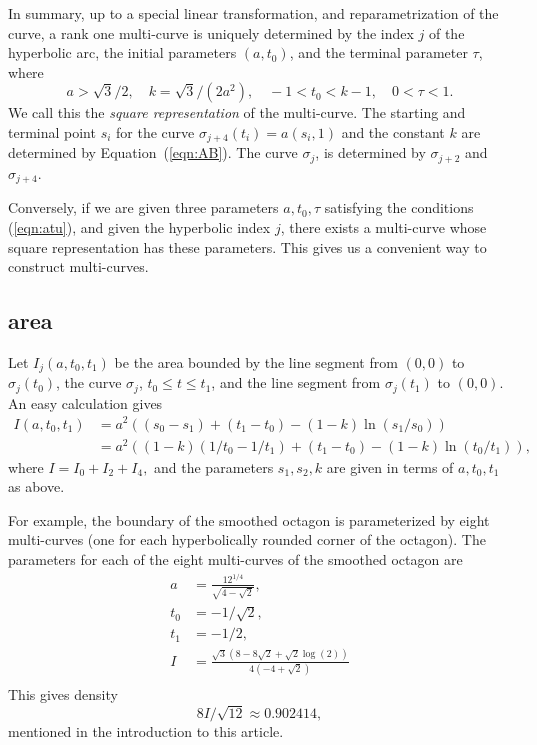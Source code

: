\documentclass[11pt]{amsart}
\def\ta{{\tau}}
\begin{document}
In summary, up to a special linear transformation, and reparametrization of the curve, a rank one multi-curve is uniquely determined by the index $j$ of the hyperbolic arc,
the initial parameters $(a,t_0)$, and the terminal parameter $\ta$, where
  \begin{equation}\label{eqn:atu}
  a > \sqrt{3}/2,\quad  k = \sqrt{3}/(2a^2),\quad -1 < t_0 < k - 1,
  \quad 0 < \ta < 1.
  \end{equation}
We call this the {\it square representation} of the multi-curve.
The starting and terminal point $s_i$ for the curve $\sigma_{j+4}(t_i) = a(s_i,1)$ and the constant $k$ are determined by Equation~(\ref{eqn:AB}).  The curve $\sigma_{j}$, is determined by $\sigma_{j+2}$ and $\sigma_{j+4}$. 

Conversely, if we are given three parameters $a,t_0,\ta$ satisfying
the conditions (\ref{eqn:atu}), and given the hyperbolic index $j$, 
there exists a multi-curve whose
square representation has these parameters.  This gives us a convenient
way to construct multi-curves.  

\subsection{area}

Let $I_j(a,t_0,t_1)$ be the area bounded by the line segment from $(0,0)$ to $\sigma_j(t_0)$, the curve $\sigma_j$, $t_0\le t\le t_1$, and the line segment from $\sigma_j(t_1)$ to $(0,0)$.  An easy calculation gives
\begin{equation}\label{eqn:I}
\begin{array}{lll}
 I(a,t_0,t_1) &=
  a^2((s_0-s_1)+(t_1-t_0) - (1-k)\ln (s_1/s_0))\\
 &= a^2 ((1-k) (1/t_0-1/t_1) + (t_1-t_0) -(1-k) \ln (t_0/t_1)),
\end{array}
\end{equation}
where 
$I=I_0+I_2+I_4,$ and the parameters $s_1,s_2,k$ are given in terms
of $a,t_0,t_1$ as above.

For example, the boundary of the 
smoothed octagon is parameterized by eight multi-curves (one for
each hyperbolically rounded corner of the octagon).  The parameters
for each of the eight multi-curves of the smoothed octagon are
$$
\begin{array}{lll}
a &= \frac{12^{1/4}}{\sqrt{4-\sqrt{2}}},\\
t_0 &= -1/\sqrt{2},\\
t_1 &= -1/2,\\
I &= \frac{\sqrt{3} \left(8-8 \sqrt{2}+\sqrt{2} \log (2)\right)}{4
   \left(-4+\sqrt{2}\right)}\\
\end{array}
$$
This gives density
$$8 I/\sqrt{12} \approx 0.902414,$$
mentioned in the introduction to this article.
\end{document}
